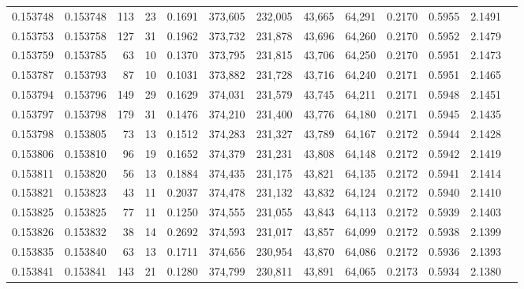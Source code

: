 \begin{tabular}{rrrrrrrrrrrrr}
0.153748 & 0.153748 &   113 &  23 &                                     0.1691 & 373,605 & 232,005 &  43,665 &  64,291 & 0.2170 & 0.5955 & 2.1491 \\
0.153753 & 0.153758 &   127 &  31 &                                     0.1962 & 373,732 & 231,878 &  43,696 &  64,260 & 0.2170 & 0.5952 & 2.1479 \\
0.153759 & 0.153785 &    63 &  10 &                                     0.1370 & 373,795 & 231,815 &  43,706 &  64,250 & 0.2170 & 0.5951 & 2.1473 \\
0.153787 & 0.153793 &    87 &  10 &                                     0.1031 & 373,882 & 231,728 &  43,716 &  64,240 & 0.2171 & 0.5951 & 2.1465 \\
0.153794 & 0.153796 &   149 &  29 &                                     0.1629 & 374,031 & 231,579 &  43,745 &  64,211 & 0.2171 & 0.5948 & 2.1451 \\
0.153797 & 0.153798 &   179 &  31 &                                     0.1476 & 374,210 & 231,400 &  43,776 &  64,180 & 0.2171 & 0.5945 & 2.1435 \\
0.153798 & 0.153805 &    73 &  13 &                                     0.1512 & 374,283 & 231,327 &  43,789 &  64,167 & 0.2172 & 0.5944 & 2.1428 \\
0.153806 & 0.153810 &    96 &  19 &                                     0.1652 & 374,379 & 231,231 &  43,808 &  64,148 & 0.2172 & 0.5942 & 2.1419 \\
0.153811 & 0.153820 &    56 &  13 &                                     0.1884 & 374,435 & 231,175 &  43,821 &  64,135 & 0.2172 & 0.5941 & 2.1414 \\
0.153821 & 0.153823 &    43 &  11 &                                     0.2037 & 374,478 & 231,132 &  43,832 &  64,124 & 0.2172 & 0.5940 & 2.1410 \\
0.153825 & 0.153825 &    77 &  11 &                                     0.1250 & 374,555 & 231,055 &  43,843 &  64,113 & 0.2172 & 0.5939 & 2.1403 \\
0.153826 & 0.153832 &    38 &  14 &                                     0.2692 & 374,593 & 231,017 &  43,857 &  64,099 & 0.2172 & 0.5938 & 2.1399 \\
0.153835 & 0.153840 &    63 &  13 &                                     0.1711 & 374,656 & 230,954 &  43,870 &  64,086 & 0.2172 & 0.5936 & 2.1393 \\
0.153841 & 0.153841 &   143 &  21 &                                     0.1280 & 374,799 & 230,811 &  43,891 &  64,065 & 0.2173 & 0.5934 & 2.1380 \\

\end{tabular}
